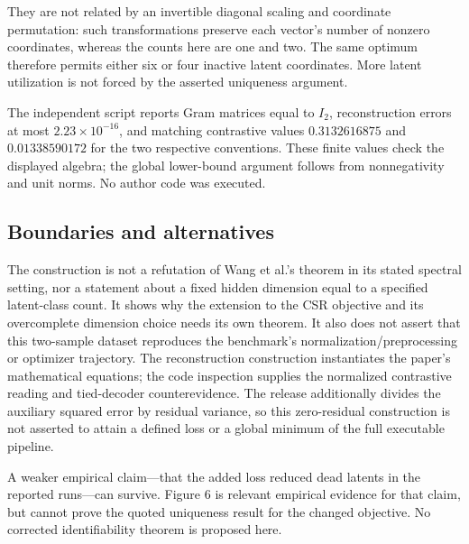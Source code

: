 \documentclass[10pt]{article}
\begin{document}
They are not related by an invertible diagonal scaling and coordinate permutation: such transformations preserve each vector’s number of nonzero coordinates, whereas the counts here are one and two. The same optimum therefore permits either six or four inactive latent coordinates. More latent utilization is not forced by the asserted uniqueness argument.\par
The independent script reports Gram matrices equal to \(I_2\), reconstruction errors at most \(2.23\times10^{-16}\), and matching contrastive values \(0.3132616875\) and \(0.01338590172\) for the two respective conventions. These finite values check the displayed algebra; the global lower-bound argument follows from nonnegativity and unit norms. No author code was executed.\par
\subsection*{Boundaries and alternatives}
The construction is not a refutation of Wang et al.’s theorem in its stated spectral setting, nor a statement about a fixed hidden dimension equal to a specified latent-class count. It shows why the extension to the CSR objective and its overcomplete dimension choice needs its own theorem. It also does not assert that this two-sample dataset reproduces the benchmark’s normalization/preprocessing or optimizer trajectory. The reconstruction construction instantiates the paper’s mathematical equations; the code inspection supplies the normalized contrastive reading and tied-decoder counterevidence. The release additionally divides the auxiliary squared error by residual variance, so this zero-residual construction is not asserted to attain a defined loss or a global minimum of the full executable pipeline.\par
A weaker empirical claim—that the added loss reduced dead latents in the reported runs—can survive. Figure 6 is relevant empirical evidence for that claim, but cannot prove the quoted uniqueness result for the changed objective. No corrected identifiability theorem is proposed here.\par
\end{document}
